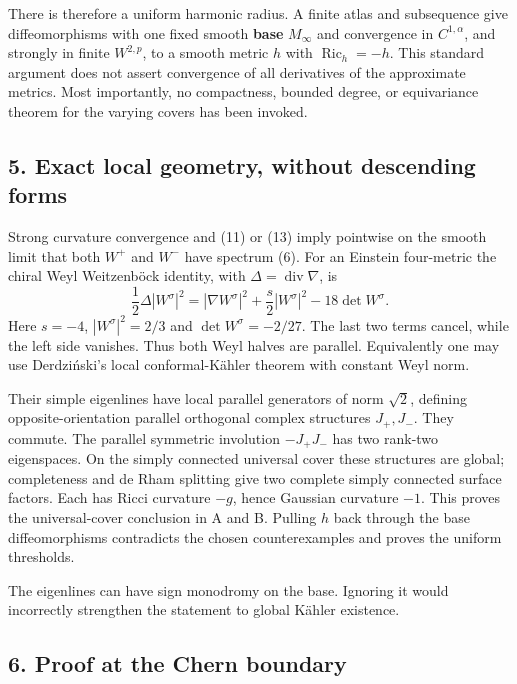 \documentclass[
  11pt,
]{article}
\begin{document}
There is therefore a uniform harmonic radius. A finite atlas and
subsequence give diffeomorphisms with one fixed smooth \textbf{base}
\(M_\infty\) and convergence in \(C^{1,\alpha}\), and strongly in finite
\(W^{2,p}\), to a smooth metric \(h\) with \(\operatorname{Ric}_h=-h\).
This standard argument does not assert convergence of all derivatives of
the approximate metrics. Most importantly, no compactness, bounded
degree, or equivariance theorem for the varying covers has been invoked.

\hypertarget{exact-local-geometry-without-descending-forms}{%
\subsection{5. Exact local geometry, without descending
forms}\label{exact-local-geometry-without-descending-forms}}

Strong curvature convergence and (11) or (13) imply pointwise on the
smooth limit that both \(W^+\) and \(W^-\) have spectrum (6). For an
Einstein four-metric the chiral Weyl Weitzenböck identity, with
\(\Delta=\operatorname{div}\nabla\), is \[
 \frac12\Delta|W^\sigma|^2
 =|\nabla W^\sigma|^2+\frac s2|W^\sigma|^2-18\det W^\sigma.
 \tag{16}
\] Here \(s=-4\), \(|W^\sigma|^2=2/3\) and \(\det W^\sigma=-2/27\). The
last two terms cancel, while the left side vanishes. Thus both Weyl
halves are parallel. Equivalently one may use Derdziński's local
conformal-Kähler theorem with constant Weyl norm.

Their simple eigenlines have local parallel generators of norm
\(\sqrt2\), defining opposite-orientation parallel orthogonal complex
structures \(J_+,J_-\). They commute. The parallel symmetric involution
\(-J_+J_-\) has two rank-two eigenspaces. On the simply connected
universal cover these structures are global; completeness and de Rham
splitting give two complete simply connected surface factors. Each has
Ricci curvature \(-g\), hence Gaussian curvature \(-1\). This proves the
universal-cover conclusion in A and B. Pulling \(h\) back through the
base diffeomorphisms contradicts the chosen counterexamples and proves
the uniform thresholds.

The eigenlines can have sign monodromy on the base. Ignoring it would
incorrectly strengthen the statement to global Kähler existence.

\hypertarget{proof-at-the-chern-boundary}{%
\subsection{6. Proof at the Chern
boundary}\label{proof-at-the-chern-boundary}}
\end{document}
